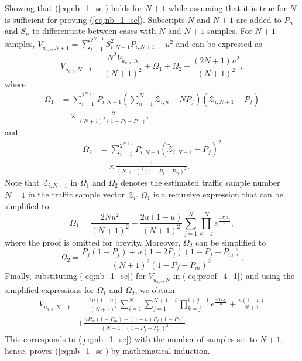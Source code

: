 \documentclass[11pt,draftclsnofoot,journal,onecolumn]{IEEEtran}
\begin{document}
\begin{IEEEproof}
Showing that (\ref{eq;nb_1_se}) holds for $N+1$ while assuming that it is true for $N$ is sufficient for proving (\ref{eq;nb_1_se}). Subscripts $N$ and $N+1$ are added to $P_n$ and $S_n$ to differentiate between cases with $N$ and $N+1$ samples. For $N+1$ samples, $V_{\tilde{u}_{a,s},N+1} = \sum_{i=1}^{2^{N+1}} S_{i,N+1}^2 P_{i,N+1} - u^2$ and can be expressed as
\begin{equation}
V_{\tilde{u}_{a,s},N+1} = \frac{N^2 V_{\tilde{u}_{a,s},N}}{(N+1)^2} + \Omega_1 + \Omega_2 - \frac{(2N+1)u^2}{(N+1)^2},
\label{eq:proof_4_1}
\end{equation}
where
\begin{align}
\Omega_1 &= \sum_{i=1}^{2^{N+1}} P_{i,N+1} \left(\sum_{n=1}^{N}\tilde{\mathcal{Z}}_{i,n}-N P_f\right)\left(\tilde{\mathcal{Z}}_{i,N+1}-P_f\right)\nonumber\\&\quad\times \frac{2}{(N+1)^2(1-P_f-P_m)^2}
\end{align}
and
\begin{align}
\Omega_2 & = \sum_{i=1}^{2^{N+1}} P_{i,N+1} (\tilde{\mathcal{Z}}_{i,N+1}-P_f)^2\nonumber\\&\quad\times \frac{1}{(N+1)^2(1-P_f-P_m)^2}.
\end{align}
Note that $\tilde{\mathcal{Z}}_{i,N+1}$ in $\Omega_1$ and $\Omega_2$ denotes the estimated traffic sample number $N+1$ in the traffic sample vector $\tilde{\mathcal{Z}_i}$. $\Omega_1$ is a recursive expression that can be simplified to
\begin{equation}
\Omega_1 = \frac{2Nu^2}{(N+1)^2} + \frac{2u(1-u)}{(N+1)^2}\sum_{j=1}^{N} \prod_{k=j}^{N} e^{\frac{-T_{k}\lambda_f}{u}},
\end{equation}
where the proof is omitted for brevity. Moreover, $\Omega_2$ can be simplified to
\begin{equation}
\Omega_2 = \frac{P_f(1-P_f)+u(1-2P_f)(1-P_f-P_m)}{(N+1)^2(1-P_f-P_m)^2}.
\end{equation}
Finally, substituting (\ref{eq;nb_1_se}) for $V_{\tilde{u}_{a,s},N}$ in (\ref{eq:proof_4_1}) and using the simplified expressions for $\Omega_1$ and $\Omega_2$, we obtain
\begin{align}
V_{\tilde{u}_{a,s},N+1} & = \frac{2u(1-u)}{(N+1)^2} \sum_{i=1}^{N} \sum_{j=1}^{N+1-i} \prod_{k=j}^{i+j-1} e^{\frac{-T_{k}\lambda_f}{u}} + \frac{u(1-u)}{N+1}\nonumber\\ & + \frac{uP_m\left(1-P_m\right) + \left(1-u\right)P_f\left(1-P_f\right)}{(N+1)\left(1-P_f-P_m\right)^2}.
\end{align}
This corresponds to (\ref{eq;nb_1_se}) with the number of samples set to $N+1$, hence, proves (\ref{eq;nb_1_se}) by mathematical induction.\end{IEEEproof}
\end{document}
